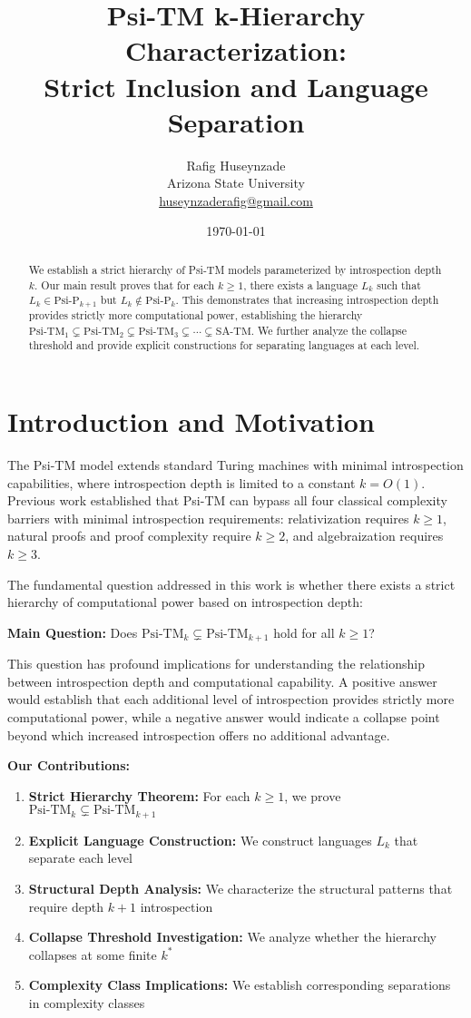 \documentclass[11pt]{article}
\title{Psi-TM k-Hierarchy Characterization:\\
\large{Strict Inclusion and Language Separation}}
\author{Rafig Huseynzade\\
Arizona State University\\
\href{mailto:huseynzaderafig@gmail.com}{huseynzaderafig@gmail.com}}
\date{\today}
\begin{document}
\maketitle

\begin{abstract}
We establish a strict hierarchy of Psi-TM models parameterized by introspection depth $k$. Our main result proves that for each $k \geq 1$, there exists a language $L_k$ such that $L_k \in \text{Psi-P}_{k+1}$ but $L_k \notin \text{Psi-P}_k$. This demonstrates that increasing introspection depth provides strictly more computational power, establishing the hierarchy $\text{Psi-TM}_1 \subsetneq \text{Psi-TM}_2 \subsetneq \text{Psi-TM}_3 \subsetneq \cdots \subsetneq \text{SA-TM}$. We further analyze the collapse threshold and provide explicit constructions for separating languages at each level.
\end{abstract}

\section{Introduction and Motivation}

The Psi-TM model extends standard Turing machines with minimal introspection capabilities, where introspection depth is limited to a constant $k = O(1)$. Previous work established that Psi-TM can bypass all four classical complexity barriers with minimal introspection requirements: relativization requires $k \geq 1$, natural proofs and proof complexity require $k \geq 2$, and algebraization requires $k \geq 3$.

The fundamental question addressed in this work is whether there exists a strict hierarchy of computational power based on introspection depth:

\textbf{Main Question:} Does $\text{Psi-TM}_k \subsetneq \text{Psi-TM}_{k+1}$ hold for all $k \geq 1$?

This question has profound implications for understanding the relationship between introspection depth and computational capability. A positive answer would establish that each additional level of introspection provides strictly more computational power, while a negative answer would indicate a collapse point beyond which increased introspection offers no additional advantage.

\textbf{Our Contributions:}
\begin{enumerate}
\item \textbf{Strict Hierarchy Theorem:} For each $k \geq 1$, we prove $\text{Psi-TM}_k \subsetneq \text{Psi-TM}_{k+1}$
\item \textbf{Explicit Language Construction:} We construct languages $L_k$ that separate each level
\item \textbf{Structural Depth Analysis:} We characterize the structural patterns that require depth $k+1$ introspection
\item \textbf{Collapse Threshold Investigation:} We analyze whether the hierarchy collapses at some finite $k^*$
\item \textbf{Complexity Class Implications:} We establish corresponding separations in complexity classes
\end{enumerate}
\end{document}
